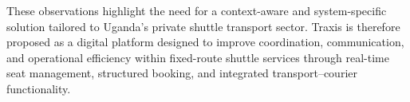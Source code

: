 These observations highlight the need for a context-aware and system-specific
solution tailored to Uganda’s private shuttle transport sector. Traxis is
therefore proposed as a digital platform designed to improve coordination,
communication, and operational efficiency within fixed-route shuttle services
through real-time seat management, structured booking, and integrated
transport–courier functionality.
